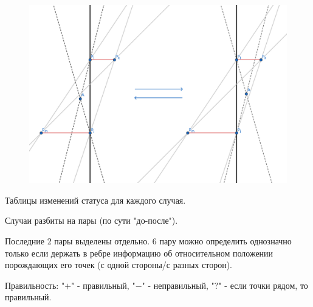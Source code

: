\documentclass[letterpaper,12pt]{article}
\begin{document}
\begin{enumerate}
            \begin{figure}[H]
                  \centering
                  \includegraphics[width=.6\linewidth]{between_2.png}
            \end{figure}
\end{enumerate}

Таблицы изменений статуса для каждого случая.

Случаи разбиты на пары (по сути "до-после").

Последние 2 пары выделены отдельно. 6 пару можно определить
однозначно только если держать в ребре информацию об относительном 
положении порождающих его точек (с одной стороны/с разных сторон).

Правильность: "$+$" - правильный, "$-$" - неправильный,
"$?$" - если точки рядом, то правильный.
\end{document}

